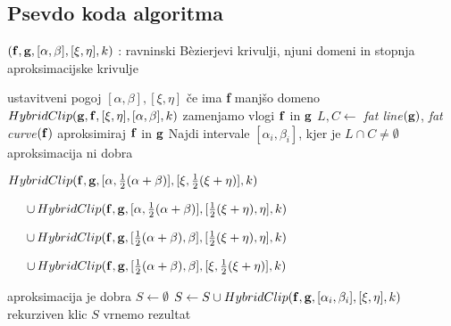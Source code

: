 
\subsection{Psevdo koda algoritma}\text{}
\smallskip
\begin{small}
   \begin{algorithmic}[1]
	\Require $({\bf f},{\bf g}, [\alpha,\beta], [\xi,\eta], k)$ : ravninski B\`{e}zierjevi krivulji, njuni domeni in stopnja aproksimacijske krivulje

	 \hfill ustavitveni pogoj
		\State \Return $[\alpha,\beta],[\xi,\eta]$
	\Else
		\If{$|\alpha - \beta | < |\xi - \eta|$} \hfill če ima {\bf f} manjšo domeno
			\State $HybridClip( {\bf g}, {\bf f}, [\xi,\eta],[\alpha,\beta],k)$ 
			\hfill zamenjamo vlogi ${\bf f}$ in ${\bf g}$
		\Else
			\State $L, C \gets $ {\em fat line}$({\bf g})$, {\em fat curve}$({\bf f})$ 
			\hfill aproksimiraj ${\bf f}$ in ${\bf g}$
			\State Najdi intervale $[\alpha _i,\beta _i]$, kjer je $L\cap C\neq \emptyset$
			 \hfill  aproksimacija ni dobra
				\State \Return \begin{varwidth}[t]{\linewidth}  
					$HybridClip({\bf f},{\bf g},[\alpha,\frac{1}{2}(\alpha+\beta)],[\xi,\frac{1}{2}(\xi+\eta)],k)$\par $ 
        \hskip\algorithmicindent
					\cup \, HybridClip({\bf f},{\bf g},[\alpha,\frac{1}{2}(\alpha+\beta)],[\frac{1}{2}(\xi+\eta), \eta],k)$\par$
        \hskip\algorithmicindent
					\cup \, HybridClip({\bf f},{\bf g},[\frac{1}{2}(\alpha+\beta), \beta],[\frac{1}{2}(\xi+\eta), \eta],k)$\par$
        \hskip\algorithmicindent
					\cup \, HybridClip({\bf f},{\bf g},[\frac{1}{2}(\alpha+\beta), \beta],[\xi, \frac{1}{2}(\xi+\eta)],k)$
					\end{varwidth}
			\Else \hfill  aproksimacija je dobra
				\State $S\gets \emptyset$
					\State $S\gets S\cup HybridClip({\bf f},{\bf g},[\alpha _i,\beta _i], [\xi,\eta],k)$
					\hfill rekurziven klic
				\EndFor
				\State \Return $S$ \hfill vrnemo rezultat
			\EndIf
		\EndIf
	\EndIf
   \end{algorithmic}
\end{small}

